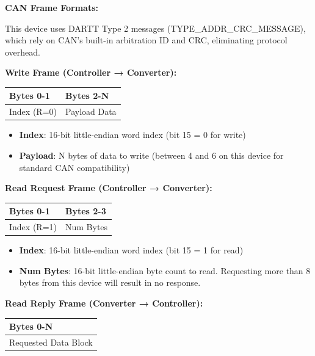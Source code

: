\documentclass[
  11pt,
]{article}
\newcounter{none} %
\providecommand{\tightlist}{%
  \setlength{\itemsep}{0pt}\setlength{\parskip}{0pt}}
\begin{document}
\textbf{CAN Frame Formats:}

This device uses DARTT Type 2 messages (TYPE\_ADDR\_CRC\_MESSAGE), which
rely on CAN's built-in arbitration ID and CRC, eliminating protocol
overhead.

\textbf{Write Frame (Controller → Converter):}

{\def\LTcaptype{none} %
\begin{longtable}[]{@{}ll@{}}
\toprule\noalign{}
Bytes 0-1 & Bytes 2-N \\
\midrule\noalign{}
\endhead
\bottomrule\noalign{}
\endlastfoot
Index (R=0) & Payload Data \\
\end{longtable}
}

\begin{itemize}
\tightlist
\item
  \textbf{Index}: 16-bit little-endian word index (bit 15 = 0 for write)
\item
  \textbf{Payload}: N bytes of data to write (between 4 and 6 on this
  device for standard CAN compatibility)
\end{itemize}

\textbf{Read Request Frame (Controller → Converter):}

{\def\LTcaptype{none} %
\begin{longtable}[]{@{}ll@{}}
\toprule\noalign{}
Bytes 0-1 & Bytes 2-3 \\
\midrule\noalign{}
\endhead
\bottomrule\noalign{}
\endlastfoot
Index (R=1) & Num Bytes \\
\end{longtable}
}

\begin{itemize}
\tightlist
\item
  \textbf{Index}: 16-bit little-endian word index (bit 15 = 1 for read)
\item
  \textbf{Num Bytes}: 16-bit little-endian byte count to read.
  Requesting more than 8 bytes from this device will result in no
  response.
\end{itemize}

\textbf{Read Reply Frame (Converter → Controller):}

{\def\LTcaptype{none} %
\begin{longtable}[]{@{}l@{}}
\toprule\noalign{}
Bytes 0-N \\
\midrule\noalign{}
\endhead
\bottomrule\noalign{}
\endlastfoot
Requested Data Block \\
\end{longtable}
}
\end{document}
